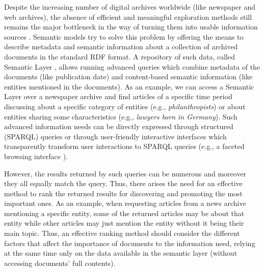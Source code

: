 \documentclass{libtex/llncs}
\begin{document}
Despite the increasing number of digital archives worldwide
(like newspaper and web archives), the absence of efficient and meaningful
exploration methods still remains the major bottleneck in the way of
turning them into usable information sources \cite{calhoun2014exploring}.
Semantic models try to solve this problem by offering the means
to describe metadata and semantic information
about a collection of archived documents in the standard RDF format.
A repository of such data, called Semantic Layer \cite{fafalios2017SemLayer},
allows running advanced queries which
combine metadata of the documents (like publication date) and
content-based semantic information (like entities mentioned in the documents).
As an example, we can access a Semantic Layer over a newspaper archive and
find articles of a specific time period discussing about a specific category of entities
(e.g., {\em philanthropists}) or about entities sharing some characteristics
(e.g., {\em lawyers born in Germany}).
Such advanced information needs can be directly expressed through structured (SPARQL) queries
or through user-friendly interactive interfaces
which transparently transform user interactions to SPARQL queries
(e.g., a faceted browsing interface \cite{tzitzikas2016faceted}).

However, the results returned by such queries can be numerous and
moreover they all equally match the query.
Thus, there arises the need for an effective method to rank the returned results
for discovering and promoting the most important ones.
As an example, when requesting articles from a news archive mentioning a specific entity,
some of the returned articles may be about that entity
while other articles may just mention the entity without it being their main topic.
Thus, an effective ranking method should
consider the different factors that affect the importance of documents to the information need,
relying at the same time only on the data
available in the semantic layer (without accessing documents' full contents).
\end{document}
